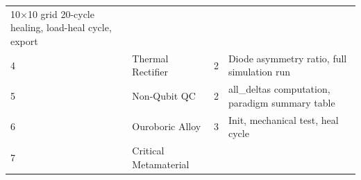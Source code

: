 \begin{longtable}[]{@{}llll@{}}
\begin{minipage}[t]{0.29\columnwidth}
10×10 grid 20-cycle healing, load-heal cycle, export\strut
\end{minipage}\tabularnewline
\begin{minipage}[t]{0.09\columnwidth}\raggedright
4\strut
\end{minipage} & \begin{minipage}[t]{0.31\columnwidth}\raggedright
Thermal Rectifier\strut
\end{minipage} & \begin{minipage}[t]{0.20\columnwidth}\raggedright
2\strut
\end{minipage} & \begin{minipage}[t]{0.29\columnwidth}\raggedright
Diode asymmetry ratio, full simulation run\strut
\end{minipage}\tabularnewline
\begin{minipage}[t]{0.09\columnwidth}\raggedright
5\strut
\end{minipage} & \begin{minipage}[t]{0.31\columnwidth}\raggedright
Non-Qubit QC\strut
\end{minipage} & \begin{minipage}[t]{0.20\columnwidth}\raggedright
2\strut
\end{minipage} & \begin{minipage}[t]{0.29\columnwidth}\raggedright
all\_deltas computation, paradigm summary table\strut
\end{minipage}\tabularnewline
\begin{minipage}[t]{0.09\columnwidth}\raggedright
6\strut
\end{minipage} & \begin{minipage}[t]{0.31\columnwidth}\raggedright
Ouroboric Alloy\strut
\end{minipage} & \begin{minipage}[t]{0.20\columnwidth}\raggedright
3\strut
\end{minipage} & \begin{minipage}[t]{0.29\columnwidth}\raggedright
Init, mechanical test, heal cycle\strut
\end{minipage}\tabularnewline
\begin{minipage}[t]{0.09\columnwidth}\raggedright
7\strut
\end{minipage} & \begin{minipage}[t]{0.31\columnwidth}\raggedright
Critical Metamaterial\strut
\end{minipage} & \begin{minipage}[t]{0.20\columnwidth}\raggedright

\end{minipage}
\end{longtable}
